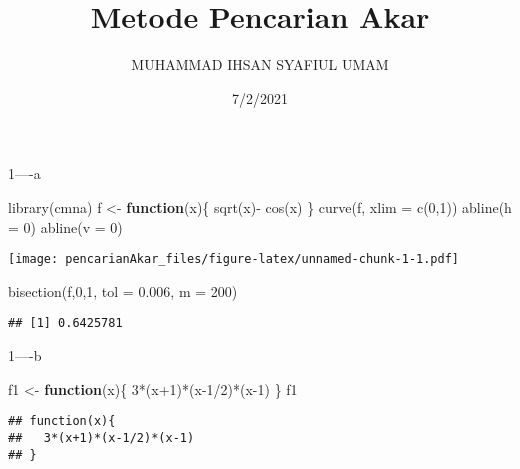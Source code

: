 \documentclass[
]{article}
\title{Metode Pencarian Akar}
\author{MUHAMMAD IHSAN SYAFIUL UMAM}
\date{7/2/2021}
\newenvironment{Shaded}{\begin{snugshade}}{\end{snugshade}}
\newcommand{\AttributeTok}[1]{\textcolor[rgb]{0.77,0.63,0.00}{#1}}
\newcommand{\ControlFlowTok}[1]{\textcolor[rgb]{0.13,0.29,0.53}{\textbf{#1}}}
\newcommand{\DecValTok}[1]{\textcolor[rgb]{0.00,0.00,0.81}{#1}}
\newcommand{\FloatTok}[1]{\textcolor[rgb]{0.00,0.00,0.81}{#1}}
\newcommand{\FunctionTok}[1]{\textcolor[rgb]{0.00,0.00,0.00}{#1}}
\newcommand{\NormalTok}[1]{#1}
\newcommand{\OtherTok}[1]{\textcolor[rgb]{0.56,0.35,0.01}{#1}}
\newcommand{\SpecialCharTok}[1]{\textcolor[rgb]{0.00,0.00,0.00}{#1}}
\begin{document}
\maketitle

1----a

\begin{Shaded}
\begin{Highlighting}[]
\FunctionTok{library}\NormalTok{(cmna)}
\NormalTok{f }\OtherTok{\textless{}{-}} \ControlFlowTok{function}\NormalTok{(x)\{}
  \FunctionTok{sqrt}\NormalTok{(x)}\SpecialCharTok{{-}} \FunctionTok{cos}\NormalTok{(x)}
\NormalTok{\}}
\FunctionTok{curve}\NormalTok{(f, }\AttributeTok{xlim =} \FunctionTok{c}\NormalTok{(}\DecValTok{0}\NormalTok{,}\DecValTok{1}\NormalTok{))}
\FunctionTok{abline}\NormalTok{(}\AttributeTok{h =} \DecValTok{0}\NormalTok{)}
\FunctionTok{abline}\NormalTok{(}\AttributeTok{v =} \DecValTok{0}\NormalTok{)}
\end{Highlighting}
\end{Shaded}

\texttt{[image: pencarianAkar\_files/figure-latex/unnamed-chunk-1-1.pdf]}

\begin{Shaded}
\begin{Highlighting}[]
\FunctionTok{bisection}\NormalTok{(f,}\DecValTok{0}\NormalTok{,}\DecValTok{1}\NormalTok{, }\AttributeTok{tol =} \FloatTok{0.006}\NormalTok{, }\AttributeTok{m =} \DecValTok{200}\NormalTok{)}
\end{Highlighting}
\end{Shaded}

\begin{verbatim}
## [1] 0.6425781
\end{verbatim}

1----b

\begin{Shaded}
\begin{Highlighting}[]
\NormalTok{f1 }\OtherTok{\textless{}{-}} \ControlFlowTok{function}\NormalTok{(x)\{}
  \DecValTok{3}\SpecialCharTok{*}\NormalTok{(x}\SpecialCharTok{+}\DecValTok{1}\NormalTok{)}\SpecialCharTok{*}\NormalTok{(x}\DecValTok{{-}1}\SpecialCharTok{/}\DecValTok{2}\NormalTok{)}\SpecialCharTok{*}\NormalTok{(x}\DecValTok{{-}1}\NormalTok{)}
\NormalTok{\}}
\NormalTok{f1}
\end{Highlighting}
\end{Shaded}

\begin{verbatim}
## function(x){
##   3*(x+1)*(x-1/2)*(x-1)
## }
\end{verbatim}
\end{document}
